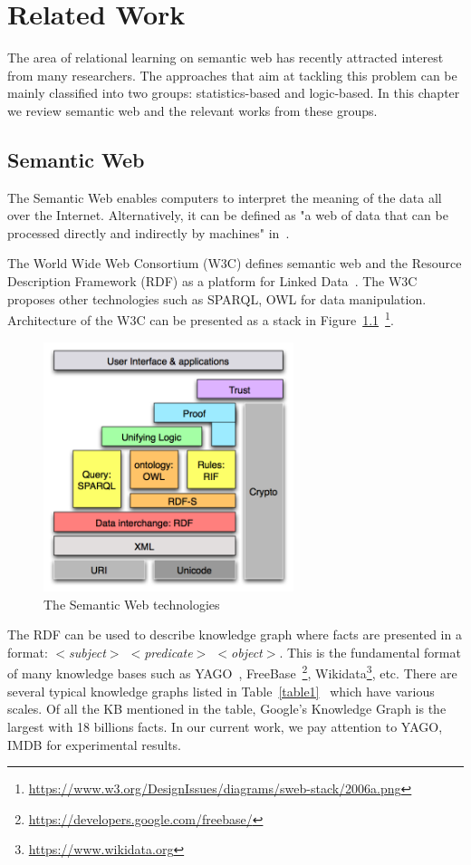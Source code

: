 \chapter{Related Work}

The area of relational learning on semantic web has recently attracted interest from many researchers. The approaches that aim at tackling this problem can be mainly classified into two groups: statistics-based and logic-based. In this chapter we review semantic web and the relevant works from these groups.

\section{Semantic Web}

The Semantic Web enables computers to interpret the meaning of the data all over the Internet. Alternatively, it can be defined as "a web of data that can be processed directly and indirectly by machines" in~\cite{ref26}.

The World Wide Web Consortium (W3C) defines semantic web and the Resource Description Framework (RDF) as a platform for Linked Data~\cite{ref26}. The W3C proposes other technologies such as SPARQL, OWL for data manipulation. Architecture of the W3C can be presented as a stack in Figure~\ref{fig1}~\footnote{\url{https://www.w3.org/DesignIssues/diagrams/sweb-stack/2006a.png}}.

\begin{figure}
\centering
\includegraphics[width=0.65\textwidth]{semantic-web.png}
\caption{The Semantic Web technologies}
\label{fig1}
\end{figure}

The RDF can be used to describe knowledge graph where facts are presented in a format: \textit{$<$subject$>$ $<$predicate$>$ $<$object$>$}. This is the fundamental format of many knowledge bases such as YAGO~\cite{ref28}, FreeBase~\footnote{\url{https://developers.google.com/freebase/}}, Wikidata\footnote{\url{https://www.wikidata.org}}, etc. There are several typical knowledge graphs listed in Table~\ref{table1}~\cite{ref27} which have various scales. Of all the KB mentioned in the table, Google's Knowledge Graph is the largest with 18 billions facts. In our current work, we pay attention to YAGO, IMDB for experimental results.

